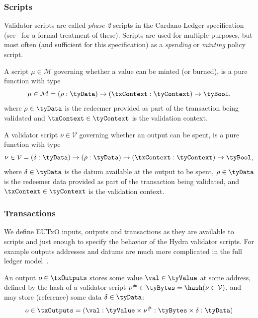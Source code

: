 \subsubsection{Scripts}

Validator scripts are called \emph{phase-2} scripts in the Cardano Ledger
specification (see~\cite{ledger-alonzo-spec} for a formal treatment of these). Scripts
are used for multiple purposes, but most often (and sufficient for this
specification) as a \emph{spending} or \emph{minting} policy script.

\begin{definition}
	A script $\mu \in \mathcal{M}$ governing whether a value can be minted (or
	burned), is a pure function with type
	\[
		\mu \in \mathcal{M} = (\rho : \tyData) \to (\txContext : \tyContext) \to\tyBool,
	\]
	where $\rho \in \tyData$ is the redeemer provided as part of the transaction
	being validated and $\txContext \in \tyContext$ is the validation
	context.
\end{definition}

\begin{definition}
	A validator script $\nu \in \mathcal{V}$ governing whether an output can be
	spent, is a pure function with type
	\[
		\nu \in \mathcal{V} = (\delta : \tyData) \to (\rho : \tyData) \to (\txContext : \tyContext) \to\tyBool,
	\]
	where $\delta \in \tyData$ is the datum available at the output to be spent,
	$\rho \in \tyData$ is the redeemer data provided as part of the transaction
	being validated, and $\txContext \in \tyContext$ is the validation
	context.
\end{definition}

\subsubsection{Transactions}

We define EUTxO inputs, outputs and transactions as they are available to
scripts and just enough to specify the behavior of the Hydra validator scripts.
For example outputs addresses and datums are much more complicated in the full
ledger model~\cite{eutxo-2, ledger-shelley-spec}.

\begin{definition}[Outputs]
	An output $o \in \txOutputs$ stores some value $\val \in \tyValue$ at some address,
	defined by the hash of a validator script $\nu^{\#} \in \tyBytes = \hash(\nu \in \mathcal{V})$,
	and may store (reference) some data $\delta \in \tyData$:
	\[
		o \in \txOutputs = (\val : \tyValue \times \nu^{\#} : \tyBytes \times \delta : \tyData)
	\]
\end{definition}


